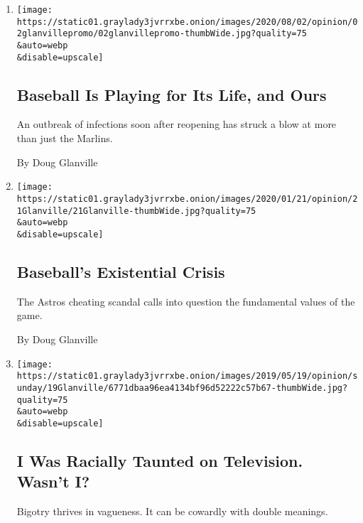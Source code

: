 \begin{enumerate}
\def\labelenumi{\arabic{enumi}.}
\item
  \href{/2020/08/02/opinion/baseball-coronavirus-Marlins.html}{}

  \texttt{[image: https://static01.graylady3jvrrxbe.onion/images/2020/08/02/opinion/02glanvillepromo/02glanvillepromo-thumbWide.jpg?quality=75\\\&auto=webp\\\&disable=upscale]}

  \hypertarget{baseball-is-playing-for-its-life-and-ours}{%
  \subsection{Baseball Is Playing for Its Life, and
  Ours}\label{baseball-is-playing-for-its-life-and-ours}}

  An outbreak of infections soon after reopening has struck a blow at
  more than just the Marlins.

  By Doug Glanville
\item
  \href{/2020/01/21/opinion/the-astros-cheating.html}{}

  \texttt{[image: https://static01.graylady3jvrrxbe.onion/images/2020/01/21/opinion/21Glanville/21Glanville-thumbWide.jpg?quality=75\\\&auto=webp\\\&disable=upscale]}

  \hypertarget{baseballs-existential-crisis}{%
  \subsection{Baseball's Existential
  Crisis}\label{baseballs-existential-crisis}}

  The Astros cheating scandal calls into question the fundamental values
  of the game.

  By Doug Glanville
\item
  \href{/2019/05/18/opinion/sunday/doug-glanville-cubs.html}{}

  \texttt{[image: https://static01.graylady3jvrrxbe.onion/images/2019/05/19/opinion/sunday/19Glanville/6771dbaa96ea4134bf96d52222c57b67-thumbWide.jpg?quality=75\\\&auto=webp\\\&disable=upscale]}

  \hypertarget{i-was-racially-taunted-on-television-wasnt-i}{%
  \subsection{I Was Racially Taunted on Television. Wasn't
  I?}\label{i-was-racially-taunted-on-television-wasnt-i}}

  Bigotry thrives in vagueness. It can be cowardly with double meanings.


\end{enumerate}
